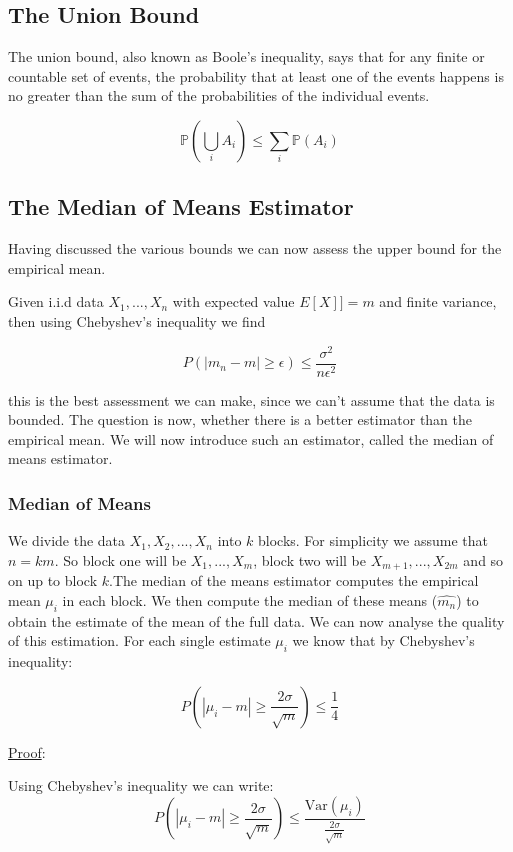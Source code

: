 \documentclass[12pt, authoryear]{elsarticle}
\begin{document}
\subsection{The Union Bound}

The union bound, also known as Boole's inequality, says that for any finite or countable set of events, the probability that at least one of the events happens is no greater than the sum of the probabilities of the individual events. 

$$\mathbb { P } \left( \bigcup _ { i } A _ { i } \right) \leq \sum _ { i } \mathbb { P } \left( A _ { i } \right)$$


\subsection{The Median of Means Estimator}

Having discussed the various bounds we can now assess the upper bound for the empirical mean. 

Given i.i.d data $X_1, ... , X_n$ with expected value $E[X]] = m$ and finite variance, then using Chebyshev's inequality we find

$$ P( | m_n - m| \geq \epsilon) \leq \frac{\sigma^2}{n \epsilon^2}$$

this is the best assessment we can make, since we can't assume that the data is bounded. The question is now, whether there is a better estimator than the empirical mean. We will now introduce such an estimator, called the median of means estimator.

\subsubsection{Median of Means}

We divide the data $X_1, X_2, ... , X_n$ into $k$ blocks. For simplicity we assume that $n=km$. So block one will be $X_1, ... , X_m$, block two will be $X_{m+1},..., X_{2m}$ and so on up to block $k$.The median of the means estimator computes the empirical mean $\mu_i$  in each block. We then compute the median of these means ($\hat{m_n}$) to obtain the estimate of the mean of the full data. We can now analyse the quality of this estimation. 
For each single estimate $\mu_i$ we know that by Chebyshev's inequality:

$$ P(| \mu_i - m | \geq \frac{2 \sigma }{\sqrt{m}}) \leq \frac{1}{4}$$

\underline{Proof}:

Using Chebyshev's inequality we can write:
$$P(| \mu_i - m | \geq \frac{2 \sigma }{\sqrt{m}}) \leq \frac{\text{Var}(\mu_i)}{\frac{2 \sigma }{\sqrt{m}}} $$
\end{document}

